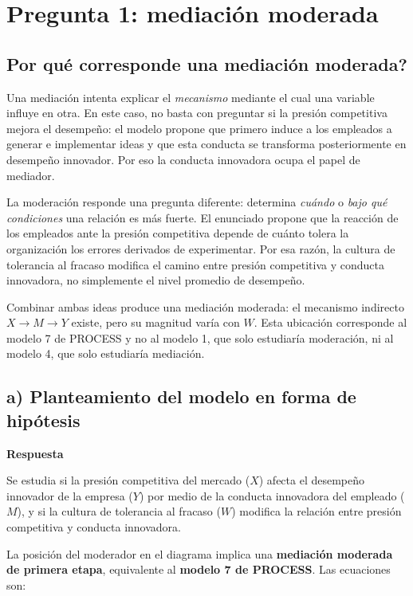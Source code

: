 \documentclass[11pt,letterpaper]{article}
\begin{document}
\section{Pregunta 1: mediación moderada}

\subsection{\texorpdfstring{\textquestiondown Por qué corresponde una mediación moderada?}{Por qué corresponde una mediación moderada?}}

Una mediación intenta explicar el \textit{mecanismo} mediante el cual una variable influye en otra. En este caso, no basta con preguntar si la presión competitiva mejora el desempeño: el modelo propone que primero induce a los empleados a generar e implementar ideas y que esta conducta se transforma posteriormente en desempeño innovador. Por eso la conducta innovadora ocupa el papel de mediador.

La moderación responde una pregunta diferente: determina \textit{cuándo} o \textit{bajo qué condiciones} una relación es más fuerte. El enunciado propone que la reacción de los empleados ante la presión competitiva depende de cuánto tolera la organización los errores derivados de experimentar. Por esa razón, la cultura de tolerancia al fracaso modifica el camino entre presión competitiva y conducta innovadora, no simplemente el nivel promedio de desempeño.

Combinar ambas ideas produce una mediación moderada: el mecanismo indirecto $X\rightarrow M\rightarrow Y$ existe, pero su magnitud varía con $W$. Esta ubicación corresponde al modelo 7 de PROCESS y no al modelo 1, que solo estudiaría moderación, ni al modelo 4, que solo estudiaría mediación.

\subsection{a) Planteamiento del modelo en forma de hipótesis}

\textbf{Respuesta}

Se estudia si la presión competitiva del mercado ($X$) afecta el desempeño innovador de la empresa ($Y$) por medio de la conducta innovadora del empleado ($M$), y si la cultura de tolerancia al fracaso ($W$) modifica la relación entre presión competitiva y conducta innovadora.

La posición del moderador en el diagrama implica una \textbf{mediación moderada de primera etapa}, equivalente al \textbf{modelo 7 de PROCESS}. Las ecuaciones son:
\end{document}
